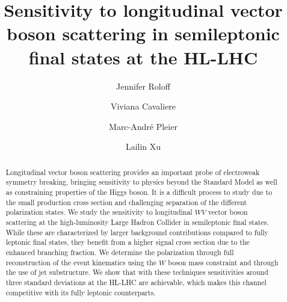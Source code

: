 \documentclass[amsmath,amssymb,aps,prd,preprint,groupedaddress]{revtex4-2}
\begin{document}
\title{Sensitivity to longitudinal vector boson scattering in semileptonic final states at the HL-LHC}

\author{Jennifer Roloff}
\author{Viviana Cavaliere}
\author{Marc-Andr\'e Pleier}
\author{Lailin Xu}



\begin{abstract}
Longitudinal vector boson scattering provides an important probe of electroweak
symmetry breaking, bringing sensitivity to physics beyond the Standard Model as
well as constraining properties of the Higgs boson. It is a difficult process to
study due to the small production cross section and challenging separation of
the different polarization states. We study the sensitivity to longitudinal
$WV$ vector boson scattering at the high-luminosity Large Hadron Collider
in semileptonic final states. While these are characterized by larger background 
contributions compared to fully leptonic final states, they benefit from a higher
signal cross section due to the enhanced branching fraction.
We determine the polarization through full
reconstruction of the event kinematics using the $W$ boson mass constraint and
through the use of jet substructure. We show that with these techniques
sensitivities around three standard deviations at the HL-LHC are achievable,
which makes this channel competitive with its fully leptonic counterparts.
\end{abstract}

\maketitle
\end{document}

